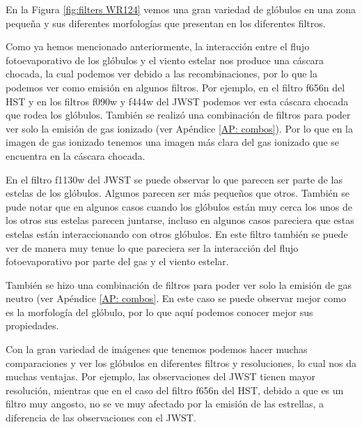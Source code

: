 \documentclass{book}
\begin{document}
En la Figura \ref{fig:filters WR124} vemos una gran variedad de
glóbulos en una zona pequeña y sus diferentes morfologías que
presentan en los diferentes filtros.

Como ya hemos mencionado anteriormente, la interacción entre el flujo
fotoevaporativo de los glóbulos y el viento estelar nos produce una
cáscara chocada, la cual podemos ver debido a las recombinaciones, por
lo que la podemos ver como emisión en algunos filtros. Por ejemplo, en
el filtro f656n del HST y en los filtros f090w y f444w del JWST
podemos ver esta cáscara chocada que rodea los glóbulos. También se
realizó una combinación de filtros para poder ver solo la emisión de
gas ionizado (ver Apéndice \ref{AP: combos}). Por lo que en la imagen
de gas ionizado tenemos una imagen más clara del gas ionizado que se
encuentra en la cáscara chocada.

En el filtro f1130w del JWST se puede observar lo que parecen ser
parte de las estelas de los glóbulos. Algunos parecen ser más pequeños
que otros. También se pude notar que en algunos casos cuando los
glóbulos están muy cerca los unos de los otros sus estelas parecen
juntarse, incluso en algunos casos pareciera que estas estelas están
interaccionando con otros glóbulos. En este filtro también se puede
ver de manera muy tenue lo que pareciera ser la interacción del flujo
fotoevaporativo por parte del gas y el viento estelar.

También se hizo una combinación de filtros para poder ver solo la
emisión de gas neutro (ver Apéndice \ref{AP: combos}. En este caso se
puede observar mejor como es la morfología del glóbulo, por lo que
aquí podemos conocer mejor sus propiedades.

Con la gran variedad de imágenes que tenemos podemos hacer muchas
comparaciones y ver los glóbulos en diferentes filtros y resoluciones,
lo cual nos da muchas ventajas. Por ejemplo, las observaciones del
JWST tienen mayor resolución, mientras que en el caso del filtro f656n
del HST, debido a que es un filtro muy angosto, no se ve muy afectado
por la emisión de las estrellas, a diferencia de las observaciones con
el JWST.
\end{document}
